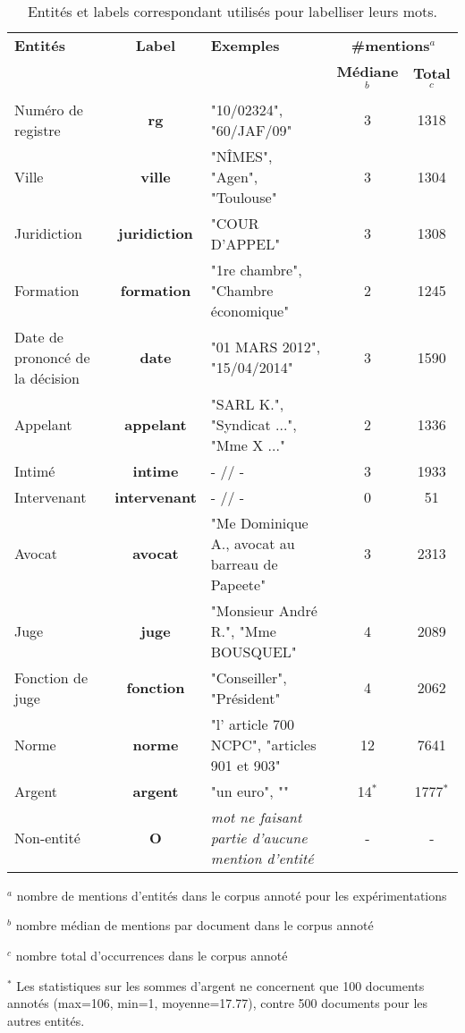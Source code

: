 \begin{table}[!ht]
\scriptsize
\begin{tabular}[c]{|p{}|c|p{}|cc|}
\hline
\textbf{Entités} & \textbf{Label} & \textbf{Exemples} & \multicolumn{2}{c|}{\textbf{\#mentions}$^a$}\\
  & & & \textbf{Médiane}$^b$& \textbf{Total}$^c$ \\ \hline
Numéro de registre & \textbf{rg} & "10/02324", "60/JAF/09" & 3 & 1318\\ \hline
Ville & \textbf{ville}& "NÎMES", "Agen", "Toulouse" & 3 & 1304\\ \hline
Juridiction & \textbf{juridiction} & "COUR D'APPEL" & 3 & 1308\\ \hline
Formation & \textbf{formation} & "1re chambre", "Chambre économique" & 2 &  1245\\ \hline
Date de prononcé de la décision & \textbf{date} & "01 MARS 2012", "15/04/2014" & 3 & 1590\\ \hline
Appelant & \textbf{appelant} & "SARL K.", "Syndicat ...", "Mme X ..." & 2 & 1336 \\ \hline
Intimé & \textbf{intime} & - // - & 3 & 1933 \\ \hline
Intervenant & \textbf{intervenant} & - // - & 0 & 51 \\ \hline
Avocat & \textbf{avocat} & "Me Dominique A., avocat au barreau de Papeete" & 3 & 2313\\ \hline
Juge & \textbf{juge} & "Monsieur André R.", "Mme BOUSQUEL" & 4 & 2089\\ \hline
Fonction de juge & \textbf{fonction} & "Conseiller", "Président" & 4 & 2062\\ \hline
Norme & \textbf{norme} & "l' article 700 NCPC", "articles 901 et 903" & 12 & 7641 \\ \hline
Argent & \textbf{argent} & "un euro", "" & 14$^*$ & 1777$^*$ \\ \hline
\noalign{\smallskip}\hline\noalign{\smallskip}
Non-entité & \textbf{O} & \textit{mot ne faisant partie d'aucune mention d'entité} & - & -\\ \hline
\end{tabular} 

$^a$ nombre de mentions d'entités dans le corpus annoté pour les expérimentations

$^b$ nombre médian de mentions par document dans le corpus annoté

$^c$ nombre total d'occurrences dans le corpus annoté

$^*$ Les statistiques sur les sommes d'argent ne concernent que 100 documents annotés (max=106, min=1, moyenne=17.77), contre 500 documents pour les autres entités.
\caption{Entités et labels correspondant utilisés pour labelliser leurs mots. }\label{p4_relevantinfo}
\end{table}


